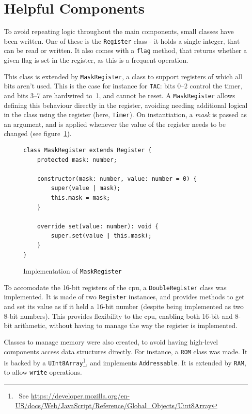 \documentclass[11pt]{report}
\newcommand{\ftnt}[1]{\footnote{~See \url{#1}}}
\begin{document}
\section{Helpful Components}

To avoid repeating logic throughout the main components, small classes have been written. One of these is the \texttt{Register} class - it holds a single integer, that can be read or written. It also comes with a \texttt{flag} method, that returns whether a given flag is set in the register, as this is a frequent operation.

This class is extended by \texttt{MaskRegister}, a class to support registers of which all bits aren't used. This is the case for instance for \texttt{TAC}: bits 0--2 control the timer, and bits 3--7 are hardwired to~1, and cannot be reset. A \texttt{MaskRegister} allows defining this behaviour directly in the register, avoiding needing additional logical in the class using the register (here, \texttt{Timer}). On instantiation, a \textit{mask} is passed as an argument, and is applied whenever the value of the register needs to be changed (see figure~\ref{fig:mask-register}).

\begin{figure}[h]
    \begin{verbatim}
class MaskRegister extends Register {
    protected mask: number;

    constructor(mask: number, value: number = 0) {
        super(value | mask);
        this.mask = mask;
    }

    override set(value: number): void {
        super.set(value | this.mask);
    }
}
    \end{verbatim}
    \caption{Implementation of \texttt{MaskRegister}}
    \label{fig:mask-register}
\end{figure}

To accomodate the 16-bit registers of the \gls{cpu}, a \texttt{DoubleRegister} class was implemented. It is made of two \texttt{Register} instances, and provides methods to get and set its value as if it held a 16-bit number (despite being implemented as two 8-bit numbers). This provides flexibility to the \gls{cpu}, enabling both 16-bit and 8-bit arithmetic, without having to manage the way the register is implemented.

Classes to manage memory were also created, to avoid having high-level components access data structures directly. For instance, a \texttt{ROM} class was made. It is backed by a \texttt{UInt8Array}\ftnt{https://developer.mozilla.org/en-US/docs/Web/JavaScript/Reference/Global_Objects/Uint8Array}, and implements \texttt{Addressable}. It is extended by \texttt{RAM}, to allow \texttt{write} operations. 
\end{document}
